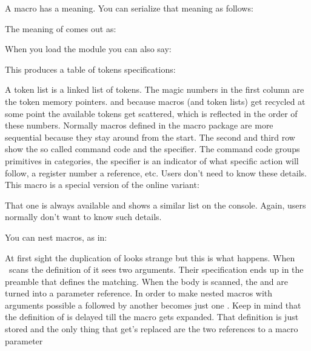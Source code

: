 \stopsection

\startsection[title=Introspection]

A macro has a meaning. You can serialize that meaning as follows:

\startbuffer[definition]
\tolerant\protected{}

\meaning\foo
\stopbuffer

\typebuffer[definition][option=TEX]

The meaning of \type {\foo} comes out as:

\startnarrower \getbuffer[definition] \stopnarrower

When you load the module  you can also say:

\startbuffer[example]
\luatokentable\foo
\stopbuffer

\typebuffer[example][option=TEX]

This produces a table of tokens specifications:

{\getbuffer[definition]\getbuffer[example]}

A token list is a linked list of tokens. The magic numbers in the first column
are the token memory pointers. and because macros (and token lists) get recycled
at some point the available tokens get scattered, which is reflected in the order
of these numbers. Normally macros defined in the macro package are more sequential
because they stay around from the start. The second and third row show the so
called command code and the specifier. The command code groups primitives in
categories, the specifier is an indicator of what specific action will follow, a
register number a reference, etc. Users don't need to know these details. This
macro is a special version of the online variant:

\starttyping[option=TEX]
\showluatokens\foo
\stoptyping

That one is always available and shows a similar list on the console. Again, users
normally don't want to know such details.

\startsection[title=nesting]

You can nest macros, as in:

\startbuffer
\def\foo#1#2{\def\oof##1{<#1>##1<#2>}}
\stopbuffer

\typebuffer[option=TEX] \getbuffer

At first sight the duplication of \type {#} looks strange but this is what
happens. When \TEX\ scans the definition of \type {\foo} it sees two arguments.
Their specification ends up in the preamble that defines the matching. When the
body is scanned, the  and  are turned into a parameter
reference. In order to make nested macros with arguments possible a \type {#}
followed by another \type {#} becomes just one \type {#}. Keep in mind that the
definition of \type {\oof} is delayed till the macro \type {\foo} gets expanded.
That definition is just stored and the only thing that get's replaced are the two
references to a macro parameter

